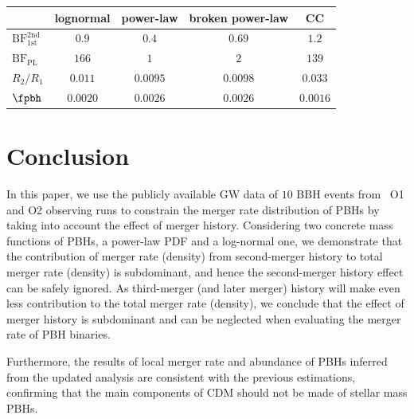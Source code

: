 \documentclass[twocolumn]{aastex631}
\begin{document}
\begin{table}[tbp!]
	\centering
	\begin{tabular}{l|c|c|c|c}
		\hline\hline
		& lognormal & power-law & broken power-law & CC \\
		\hline
		$\mathrm{BF}^{\mathrm{2nd}}_{\mathrm{1st}}$ & $0.9$ & $0.4$ & $0.69$ & $1.2$ \\
		$\mathrm{BF}_{\mathrm{PL}}$ & $166$ & $1$ & $2$ & $139$ \\
		$R_2/R_1$ & $0.011$ & $0.0095$ & $0.0098$ & $0.033$ \\
		$\fpbh$ & $0.0020$ & $0.0026$ & $0.0026$ & $0.0016$ \\
		\hline
	\end{tabular}
\end{table}


\section{\label{conclusion}Conclusion}

In this paper, we use the publicly available GW data of $10$ BBH events from 
\lvc\ O1 and O2 observing runs to constrain the merger rate distribution 
of PBHs by taking into account the effect of merger history.
Considering two concrete mass functions of PBHs, a power-law PDF and 
a log-normal one, we demonstrate that the contribution of merger rate (density)
from second-merger history to total merger rate (density) is 
subdominant, and hence the second-merger history effect can be safely ignored.
As third-merger (and later merger) history will make even less contribution to 
the total merger rate (density), we conclude that the effect of merger history
is subdominant and can be neglected when evaluating the merger rate of PBH
binaries.

Furthermore, the results of local merger rate and abundance of PBHs inferred from the updated
analysis are consistent with the previous estimations, 
confirming that the main components of CDM should not be made of stellar 
mass PBHs. 
\end{document}

